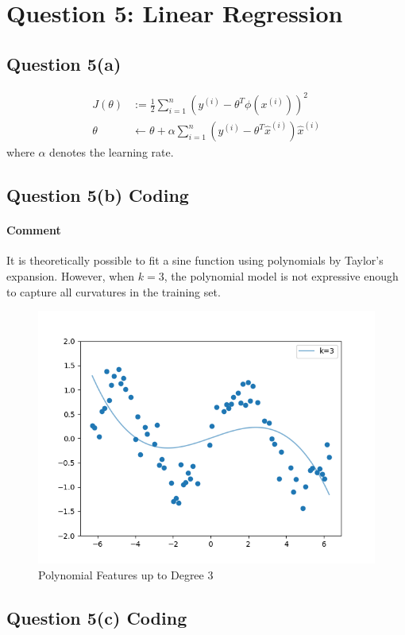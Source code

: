 \documentclass[11pt]{article}
\newcommand{\upi}[0]{^{(i)}}
\begin{document}
	\section{Question 5: Linear Regression}
	\subsection{Question 5(a)}
	\begin{align}
		J(\theta) &:= \frac{1}{2} \sum_{i=1}^n \left(y\upi - \theta^T \phi(x\upi) \right)^2 \\
		\theta &\leftarrow \theta + \alpha \sum_{i=1}^n \left(y\upi - \theta^T \hat{x}\upi \right) \hat{x}\upi
	\end{align}
	where $\alpha$ denotes the learning rate.
	
	\newpage
	\subsection{Question 5(b) Coding}
	\paragraph{Comment} It is theoretically possible to fit a sine function using polynomials by Taylor's expansion. However, when $k=3$, the polynomial model is not expressive enough to capture all curvatures in the training set.
	\begin{figure}[h]
		\centering
		\includegraphics[width=0.6\linewidth]{src/featuremaps/5b.png}
		\caption{Polynomial Features up to Degree 3}
	\end{figure}
	
	\newpage
	\subsection{Question 5(c) Coding}
\end{document}
